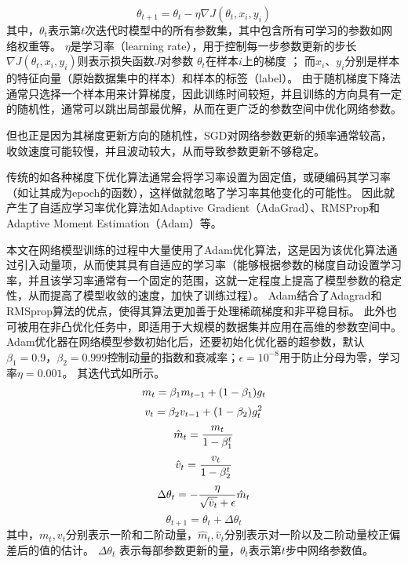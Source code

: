 \begin{equation}
  \label{equation:SGD}
  \theta_{t+1} = \theta_{t} - \eta \nabla J(\theta_{t}, x_i, y_i)
\end{equation}
其中，$\theta_{t}$表示第$t$次迭代时模型中的所有参数集，其中包含所有可学习的参数如网络权重等。
$\eta$是学习率（learning rate），用于控制每一步参数更新的步长
$\nabla J(\theta_{t}, x_i, y_i)$则表示损失函数$J$对参数 $\theta_{t}$在样本$i$上的梯度 ；
而$x_i$、$y_i$分别是样本的特征向量（原始数据集中的样本）和样本的标签（label）。
由于随机梯度下降法通常只选择一个样本用来计算梯度，因此训练时间较短，并且训练的方向具有一定的随机性，通常可以跳出局部最优解，从而在更广泛的参数空间中优化网络参数。

但也正是因为其梯度更新方向的随机性，SGD对网络参数更新的频率通常较高，收敛速度可能较慢，并且波动较大，从而导致参数更新不够稳定。

传统的如各种梯度下优化算法通常会将学习率设置为固定值，或硬编码其学习率（如让其成为epoch的函数），这样做就忽略了学习率其他变化的可能性。
因此就产生了自适应学习率优化算法如Adaptive Gradient（AdaGrad）、RMSProp和Adaptive Moment Estimation（Adam）等。

本文在网络模型训练的过程中大量使用了Adam优化算法\cite{2014Adam}，这是因为该优化算法通过引入动量项，从而使其具有自适应的学习率（能够根据参数的梯度自动设置学习率，并且该学习率通常有一个固定的范围，这就一定程度上提高了模型参数的稳定性，从而提高了模型收敛的速度，加快了训练过程）。
Adam结合了Adagrad和RMSprop算法的优点，使得其算法更加善于处理稀疏梯度和非平稳目标。
此外也可被用在非凸优化任务中，即适用于大规模的数据集并应用在高维的参数空间中。
Adam优化器在网络模型参数初始化后，还要初始化优化器的超参数，默认$\beta_1 = 0.9$，$\beta_2 = 0.999$控制动量的指数和衰减率；$\epsilon = 10^{-8}$用于防止分母为零，学习率$\eta = 0.001$。
其迭代式如所示。
\begin{equation}
  \label{equation:Adamiter:a1}
  \centering
  m_t  = \beta_1 m_{t-1} + (1 - \beta_1) g_t
\end{equation}
\begin{equation}
  \label{equation:Adamiter:a2}
  \centering
  v_t  = \beta_2 v_{t-1} + (1 - \beta_2) g_t^2
\end{equation}
\begin{equation}
  \label{equation:Adamiter:a3}
  \centering  
  \hat{m}_t  = \frac{m_t}{1 - \beta_1^t}
\end{equation}
\begin{equation}
  \label{equation:Adamiter:a4}
  \centering
  \hat{v}_t  = \frac{v_t}{1 - \beta_2^t} 
\end{equation}
\begin{equation}
  \label{equation:Adamiter:a5}
  \centering
  \Delta \theta_t  = -\frac{\eta}{\sqrt{\hat{v}_t} + \epsilon} \hat{m}_t 
\end{equation}
\begin{equation}
  \label{equation:Adamiter:a6}
  \theta_{t+1} = \theta_t + \Delta \theta_t 
\end{equation}
其中，$m_t, v_t$分别表示一阶和二阶动量，$\hat{m}_t, \hat{v}_t$分别表示对一阶以及二阶动量校正偏差后的值的估计。
$\Delta\theta_t$ 表示每部参数更新的量，$\theta_t$表示第$t$步中网络参数值。


